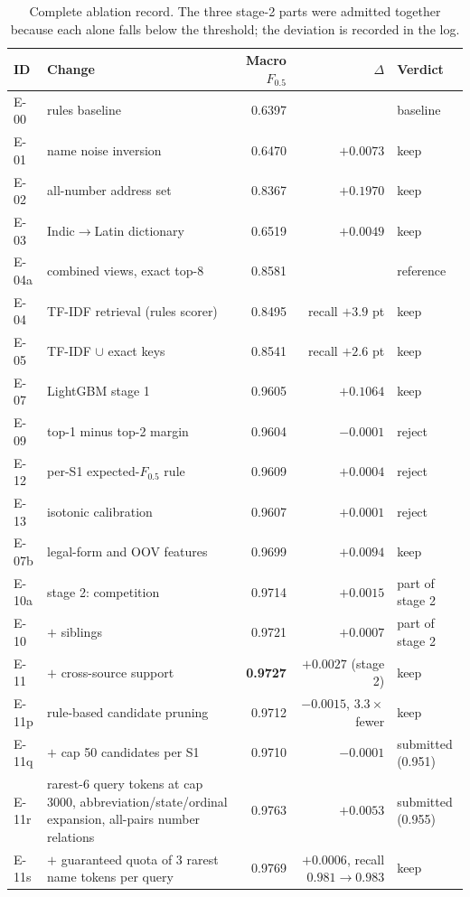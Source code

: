\documentclass[10pt]{article}
\newcommand{\Fh}{F_{0.5}}
\begin{document}
\begin{table}[htbp]
\centering\small
\caption{Complete ablation record. The three stage-2 parts were admitted together because each alone falls below the threshold; the deviation is recorded in the log.}
\label{tab:ablation}
\begin{tabular}{@{}llrrl@{}}
\toprule
ID & Change & Macro $\Fh$ & $\Delta$ & Verdict \\
\midrule
E-00 & rules baseline & 0.6397 & & baseline \\
E-01 & name noise inversion & 0.6470 & $+0.0073$ & keep \\
E-02 & all-number address set & 0.8367 & $+0.1970$ & keep \\
E-03 & Indic$\to$Latin dictionary & 0.6519 & $+0.0049$ & keep \\
E-04a & combined views, exact top-8 & 0.8581 & & reference \\
E-04 & TF-IDF retrieval (rules scorer) & 0.8495 & recall $+3.9$ pt & keep \\
E-05 & TF-IDF $\cup$ exact keys & 0.8541 & recall $+2.6$ pt & keep \\
E-07 & LightGBM stage 1 & 0.9605 & $+0.1064$ & keep \\
E-09 & top-1 minus top-2 margin & 0.9604 & $-0.0001$ & reject \\
E-12 & per-S1 expected-$\Fh$ rule & 0.9609 & $+0.0004$ & reject \\
E-13 & isotonic calibration & 0.9607 & $+0.0001$ & reject \\
E-07b & legal-form and OOV features & 0.9699 & $+0.0094$ & keep \\
E-10a & stage 2: competition & 0.9714 & $+0.0015$ & part of stage 2 \\
E-10 & $+$ siblings & 0.9721 & $+0.0007$ & part of stage 2 \\
E-11 & $+$ cross-source support & \textbf{0.9727} & $+0.0027$ (stage 2) & keep \\
E-11p & rule-based candidate pruning & 0.9712 & $-0.0015$, $3.3\times$ fewer & keep \\
E-11q & $+$ cap 50 candidates per S1 & 0.9710 & $-0.0001$ & submitted (0.951) \\
E-11r & rarest-6 query tokens at cap 3000, abbreviation/state/ordinal expansion, all-pairs number relations & 0.9763 & $+0.0053$ & submitted (0.955) \\
E-11s & $+$ guaranteed quota of 3 rarest name tokens per query & 0.9769 & $+0.0006$, recall $0.981 \to 0.983$ & keep \\

\end{tabular}
\end{table}
\end{document}
